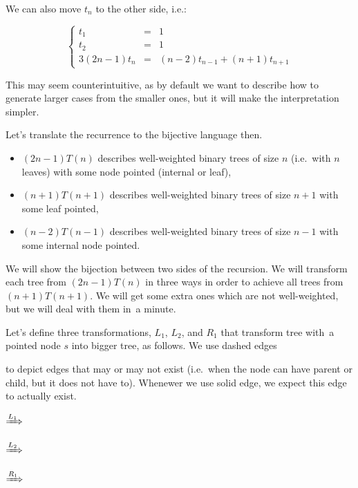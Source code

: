 \documentclass[final]{article}
\theoremstyle{definition}
\theoremstyle{definition}
\theoremstyle{remark}
\newcommand{\includeinlinescaledsvg}[3]{\begin{minipage}{#1\textwidth}\begin{center}\end{center}\end{minipage}}
\begin{document}
We can also move \(t_n\) to the other side, i.e.:

\[\left\{\begin{array}{rcl}
            t_1 &=& 1\\
            t_2 &=& 1\\
            3 (2 n - 1) t_n &=& (n - 2) t_{n - 1} + (n + 1) t_{n + 1}
\end{array}\right.\]

This may seem counterintuitive, as by default we want to describe how to generate larger cases from the smaller ones, but it will make the interpretation simpler.

Let's translate the recurrence to the bijective language then.
\begin{itemize}
    \item \((2 n - 1) T(n)\) describes well-weighted binary trees of size \(n\) (i.e.~with \(n\) leaves) with some node pointed (internal or leaf),
    \item \((n + 1) T(n + 1)\) describes well-weighted binary trees of size \(n + 1\) with some leaf pointed,
    \item \((n - 2) T(n - 1)\) describes well-weighted binary trees of size \(n - 1\) with some internal node pointed.
\end{itemize}

We will show the bijection between two sides of the recursion. We will transform each tree from \((2 n - 1) T(n)\) in three ways in order to achieve all trees from \((n + 1) T(n + 1)\). We will get some extra ones which are not well-weighted, but we will deal with them in~a minute.

Let's define three transformations, \(L_1\), \(L_2\), and \(R_1\) that transform tree with~a pointed node \(s\) into bigger tree, as follows. We use dashed edges 
\begin{minipage}{1.5em}

\end{minipage}
to depict edges that may or may not exist (i.e.~when the node can have parent or child, but it does not have to). Whenewer we use solid edge, we expect this edge to actually exist.

\begin{center}
    \includeinlinescaledsvg{.16}{.5}{schroder__lr_base}%
    \(\xRightarrow{L_1}\)%
    \includeinlinescaledsvg{.16}{.5}{schroder__l1}%
    \hspace{.1\textwidth}%
    \includeinlinescaledsvg{.16}{.5}{schroder__lr_base}%
    \(\xRightarrow{L_2}\)%
    \includeinlinescaledsvg{.16}{.5}{schroder__l2}%

    \includeinlinescaledsvg{.16}{.5}{schroder__lr_base}%
    \(\xRightarrow{R_1}\)%
    \includeinlinescaledsvg{.16}{.5}{schroder__r1}%
\end{center}
\end{document}
